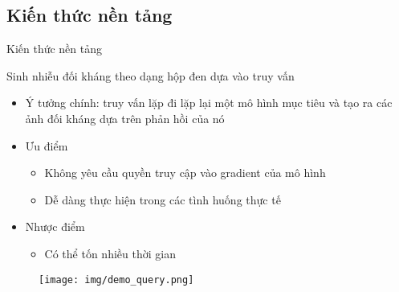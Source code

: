 \documentclass[aspectratio=169, 12pt]{beamer}
\begin{document}
\begin{spacing}{1.1}

\section{Kiến thức nền tảng}

\begin{frame}
\vfill
\begin{center}
\Large{Kiến thức nền tảng}
\end{center}
\vfill
\end{frame}

\begin{frame}{Sinh nhiễu đối kháng theo dạng hộp đen dựa vào truy vấn}

    \begin{minipage}{0.71\textwidth}
    
    \begin{itemize}
        \item Ý tưởng chính: truy vấn lặp đi lặp lại một mô hình mục tiêu và tạo ra các ảnh đối kháng dựa trên phản hồi của nó

        \item Ưu điểm
        \begin{itemize}
            \item Không yêu cầu quyền truy cập vào gradient của mô hình
            \item Dễ dàng thực hiện trong các tình huống thực tế
        \end{itemize}
    
        \item Nhược điểm
        \begin{itemize}
            \item Có thể tốn nhiều thời gian
        \end{itemize}
    \end{itemize}
    
    \end{minipage}
    \hfill
    \begin{minipage}{0.27\textwidth}
    
    \centering
    \begin{figure}[h]
    \texttt{[image: img/demo\_query.png]}
    \end{figure}
    

\end{minipage}
\end{frame}
\end{spacing}
\end{document}
